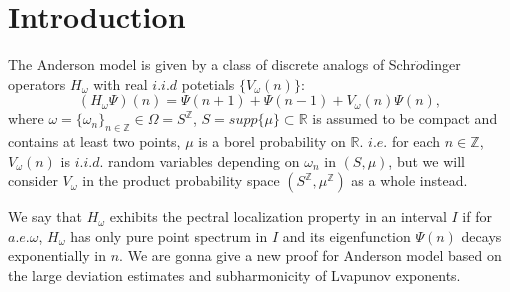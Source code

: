 \section{Introduction}
The Anderson model is given by a class of discrete analogs of Schr$\ddot{o}$dinger operators $H_{\omega}$ with real $i.i.d$ potetials $\{V_{\omega}(n)\}$:
\begin{equation}
  (H_{\omega}\Psi)(n)=\Psi(n+1)+\Psi(n-1)+V_{\omega}(n)\Psi(n),
\end{equation}
where $\omega=\{\omega_n\}_{n\in\mathbb{Z}}\in\Omega=S^{\mathbb{Z}}$, $S=supp\{\mu\}\subset \mathbb{R}$ is assumed to be compact and contains at least two points, $\mu$ is a borel probability on $\mathbb{R}$. $i.e.$ for each $n\in\mathbb{Z}$, $V_{\omega} (n)$ is $i.i.d.$ random variables depending on $\omega_n$ in $(S,\mu)$, but we will consider $V_\omega$ in the product probability space $ (S^{\mathbb{Z}},\mu^{\mathbb{Z}})$ as a whole instead.

We say that $H_\omega$ exhibits the pectral localization property in an interval $I$ if for $a.e.\omega$, $H_\omega$ has only pure point spectrum in $I$ and its eigenfunction $\Psi(n)$ decays exponentially in $n$. We are gonna give a new proof for Anderson model based on the large deviation estimates and subharmonicity of Lvapunov exponents.
